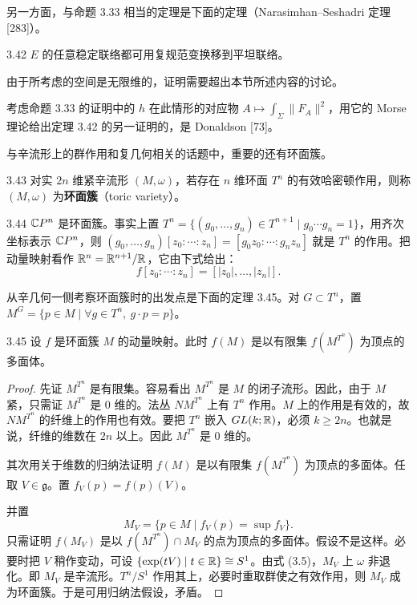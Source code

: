 另一方面，与命题 3.33 相当的定理是下面的定理（Narasimhan–Seshadri 定理 [283]）。

\begin{theorem}{3.42}
  $E$ 的任意稳定联络都可用复规范变换移到平坦联络。
\end{theorem}

由于所考虑的空间是无限维的，证明需要超出本节所述内容的讨论。

考虑命题 3.33 的证明中的 $h$ 在此情形的对应物 $A\mapsto\int_\Sigma\|F_A\|^2$，用它的 Morse 理论给出定理 3.42 的另一证明的，是 Donaldson [73]。

与辛流形上的群作用和复几何相关的话题中，重要的还有环面簇。

\begin{definition}{3.43}
  对实 $2n$ 维紧辛流形 $(M,\omega)$，若存在 $n$ 维环面 $T^n$ 的有效哈密顿作用，则称 $(M,\omega)$ 为\textbf{环面簇}（toric variety）。
\end{definition}

\begin{example}{3.44}
  $\mathbb{C}P^n$ 是环面簇。事实上置 $T^n=\{(g_0,\dots,g_n)\in T^{n+1}\mid g_0\cdots g_n=1\}$，用齐次坐标表示 $\mathbb{C}P^n$，则 $(g_0,\dots,g_n)[z_0:\cdots:z_n]=[g_0z_0:\cdots:g_nz_n]$ 就是 $T^n$ 的作用。把动量映射看作 $\mathbb{R}^n=\mathbb{R}^{n+1}/\mathbb{R}$，它由下式给出：
  \[
    f[z_0:\cdots:z_n]=[|z_0|,\dots,|z_n|].
  \]
\end{example}

从辛几何一侧考察环面簇时的出发点是下面的定理 3.45。对 $G\subset T^n$，置 $M^G=\{p\in M\mid\forall g\in T^n,\ g\cdot p=p\}$。

\begin{theorem*}{3.45}
  设 $f$ 是环面簇 $M$ 的动量映射。此时 $f(M)$ 是以有限集 $f(M^{T^n})$ 为顶点的多面体。
\end{theorem*}

\begin{proof}
  先证 $M^{T^n}$ 是有限集。容易看出 $M^{T^n}$ 是 $M$ 的闭子流形。因此，由于 $M$ 紧，只需证 $M^{T^n}$ 是 0 维的。法丛 $NM^{T^n}$ 上有 $T^n$ 作用。$M$ 上的作用是有效的，故 $NM^{T^n}$ 的纤维上的作用也有效。要把 $T^n$ 嵌入 $GL(k;\mathbb{R})$，必须 $k\ge2n$。也就是说，纤维的维数在 $2n$ 以上。因此 $M^{T^n}$ 是 0 维的。

  其次用关于维数的归纳法证明 $f(M)$ 是以有限集 $f(M^{T^n})$ 为顶点的多面体。任取 $V\in\mathfrak{g}$。置 $f_V(p)=f(p)(V)$。

  并置
  \[
    M_V=\{p\in M\mid f_V(p)=\sup f_V\}.
  \]
  只需证明 $f(M_V)$ 是以 $f(M^{T^n})\cap M_V$ 的点为顶点的多面体。假设不是这样。必要时把 $V$ 稍作变动，可设 $\{\exp(tV)\mid t\in\mathbb{R}\}\cong S^1$。由式 (3.5)，$M_V$ 上 $\omega$ 非退化。即 $M_V$ 是辛流形。$T^n/S^1$ 作用其上，必要时重取群使之有效作用，则 $M_V$ 成为环面簇。于是可用归纳法假设，矛盾。
\end{proof}

